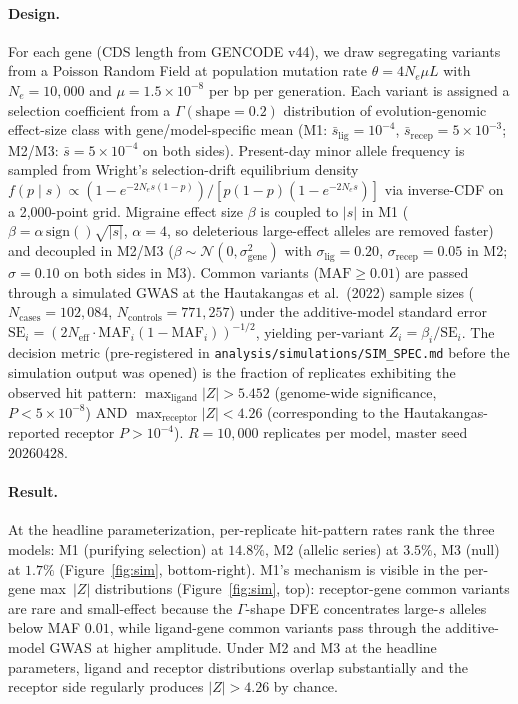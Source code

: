 \documentclass[11pt]{article}
\begin{document}
\paragraph{Design.} For each gene (CDS length from GENCODE v44), we draw segregating variants from a Poisson Random Field at population mutation rate $\theta = 4 N_e \mu L$ with $N_e = 10{,}000$ and $\mu = 1.5 \times 10^{-8}$ per bp per generation. Each variant is assigned a selection coefficient from a $\Gamma(\text{shape}{=}0.2)$ distribution of evolution-genomic effect-size class with gene/model-specific mean (M1: $\bar{s}_{\text{lig}} = 10^{-4}$, $\bar{s}_{\text{recep}} = 5 \times 10^{-3}$; M2/M3: $\bar{s} = 5 \times 10^{-4}$ on both sides). Present-day minor allele frequency is sampled from Wright's selection-drift equilibrium density $f(p \mid s) \propto (1 - e^{-2 N_e s (1 - p)}) / [p(1-p)(1 - e^{-2 N_e s})]$ via inverse-CDF on a 2{,}000-point grid. Migraine effect size $\beta$ is coupled to $|s|$ in M1 ($\beta = \alpha \, \mathrm{sign}() \sqrt{|s|}$, $\alpha = 4$, so deleterious large-effect alleles are removed faster) and decoupled in M2/M3 ($\beta \sim \mathcal{N}(0, \sigma_{\text{gene}}^2)$ with $\sigma_{\text{lig}} = 0.20$, $\sigma_{\text{recep}} = 0.05$ in M2; $\sigma = 0.10$ on both sides in M3). Common variants ($\mathrm{MAF} \geq 0.01$) are passed through a simulated GWAS at the Hautakangas et al.\ (2022) sample sizes ($N_{\text{cases}} = 102{,}084$, $N_{\text{controls}} = 771{,}257$) under the additive-model standard error $\mathrm{SE}_i = (2 N_{\text{eff}} \cdot \mathrm{MAF}_i (1 - \mathrm{MAF}_i))^{-1/2}$, yielding per-variant $Z_i = \beta_i / \mathrm{SE}_i$. The decision metric (pre-registered in \texttt{analysis/simulations/SIM\_SPEC.md} before the simulation output was opened) is the fraction of replicates exhibiting the observed hit pattern: $\max_{\text{ligand}} |Z| > 5.452$ (genome-wide significance, $P < 5 \times 10^{-8}$) AND $\max_{\text{receptor}} |Z| < 4.26$ (corresponding to the Hautakangas-reported receptor $P > 10^{-4}$). $R = 10{,}000$ replicates per model, master seed $20260428$.

\paragraph{Result.} At the headline parameterization, per-replicate hit-pattern rates rank the three models: M1 (purifying selection) at $14.8\%$, M2 (allelic series) at $3.5\%$, M3 (null) at $1.7\%$ (Figure~\ref{fig:sim}, bottom-right). M1's mechanism is visible in the per-gene max~$|Z|$ distributions (Figure~\ref{fig:sim}, top): receptor-gene common variants are rare and small-effect because the $\Gamma$-shape DFE concentrates large-$s$ alleles below MAF $0.01$, while ligand-gene common variants pass through the additive-model GWAS at higher amplitude. Under M2 and M3 at the headline parameters, ligand and receptor distributions overlap substantially and the receptor side regularly produces $|Z| > 4.26$ by chance.
\end{document}
